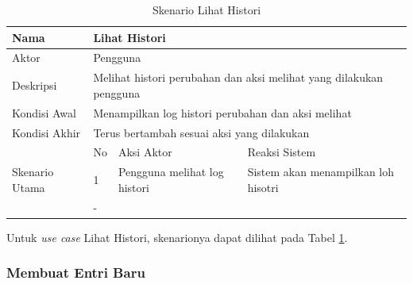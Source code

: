 \begin{table}
\centering
\caption[Tabel Skenario Lihat Histori]{Skenario Lihat Histori}
\label{tab:skenariohistori}
\begin{tabular}{|p{1.4cm}|p{0.4cm}|p{2cm}|p{2cm}|p{2cm}|p{2cm}|}
\hline
Nama & \multicolumn{5}{p{8cm}|}{Lihat Histori} \\ \hline
Aktor & \multicolumn{5}{p{8cm}|}{Pengguna} \\ \hline
Deskripsi & \multicolumn{5}{p{8cm}|}{Melihat histori perubahan dan aksi melihat
yang dilakukan pengguna} \\ \hline
Kondisi Awal & \multicolumn{5}{p{8cm}|}{Menampilkan log histori perubahan dan
aksi melihat} \\ \hline
Kondisi Akhir & \multicolumn{5}{p{8cm}|}{Terus bertambah sesuai aksi yang
dilakukan} \\ \hline
\multirow{3}{*}{\parbox{1.4cm}{Skenario Utama}} & No &
\multicolumn{2}{p{4cm}|}{Aksi Aktor} & \multicolumn{2}{p{4cm}|}{Reaksi Sistem}
\\ \cline{2-6}
& 1 & \multicolumn{2}{p{4cm}|}{Pengguna melihat log histori} &
\multicolumn{2}{p{4cm}|}{Sistem akan menampilkan loh hisotri} \\ \hline
Eksepsi & \multicolumn{5}{p{8cm}|}{-} \\ \hline
\end{tabular}
\end{table}

Untuk {\it use case} Lihat Histori, skenarionya dapat dilihat pada Tabel
\ref{tab:skenariohistori}.

\subsubsection{Membuat Entri Baru}

